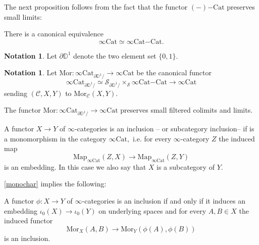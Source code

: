 \documentclass[10pt,oneside]{article}
\numberwithin{equation}{section} %
\numberwithin{figure}{section} %
\theoremstyle{plain}
\theoremstyle{definition}
\newtheorem{notation}[thm]{Notation}
\newcommand{\bD}{{\mathbb D}}
\newcommand{\mC}{{\mathcal C}}
\newcommand{\mS}{{\mathcal S}}
\newcommand{\X}{X}
\newcommand{\Y}{Y}
\newcommand{\Cat}{\mathrm{Cat}}
\newcommand{\Map}{{\mathrm{Map}}}
\newcommand{\Mor}{{\mathrm{Mor}}}
\begin{document}
The next proposition follows from the fact that the functor ${(-)\mathrm{-}\Cat}$ preserves small limits:

\begin{proposition}\label{fix}
	
There is a canonical equivalence
$$ \infty\Cat \simeq {\infty\Cat}\mathrm{-}\Cat. $$
	
\end{proposition}

\begin{notation}
Let $\partial\bD^1$ denote the two element set $\{0,1\}$.
\end{notation}


\begin{notation}
Let $\Mor: \infty\Cat_{\partial\bD^1/} \to \infty\Cat$
be the canonical functor $$\infty\Cat_{\partial\bD^1/} \simeq \mS_{\partial\bD^1/}\times_\mS {\infty\Cat}\mathrm{-}\Cat \to \infty\Cat $$
sending $(\mC,\X,\Y)$ to $\Mor_\mC(\X,\Y).$
\end{notation}

\begin{remark}\label{homfil}
The functor $\Mor: \infty\Cat_{\partial\bD^1/} \to \infty\Cat$
preserves small filtered colimits and limits.
	
\end{remark}

\begin{definition}

A functor $X \to Y$ of $\infty$-categories is an inclusion -- or subcategory inclusion-- if is a monomorphism in the category $\infty\Cat,$ i.e. for every $\infty$-category $Z$ the induced map $$\Map_{\infty\Cat}(Z,X) \to \Map_{\infty\Cat}(Z,Y)$$ is an embedding.
In this case we also say that $X$ is a subcategory of $Y$.
 
\end{definition}

\cref{monochar} implies the following:

\begin{corollary}

A functor $\phi: X \to Y$ of $\infty$-categories is an inclusion if and only if it induces an embedding $\iota_0(X) \to \iota_0(Y)$ on underlying spaces and for every $A,B \in X$ the induced functor
$$\Mor_X(A, B) \to \Mor_Y(\phi(A), \phi(B))$$ is an inclusion.

\end{corollary}
\end{document}
